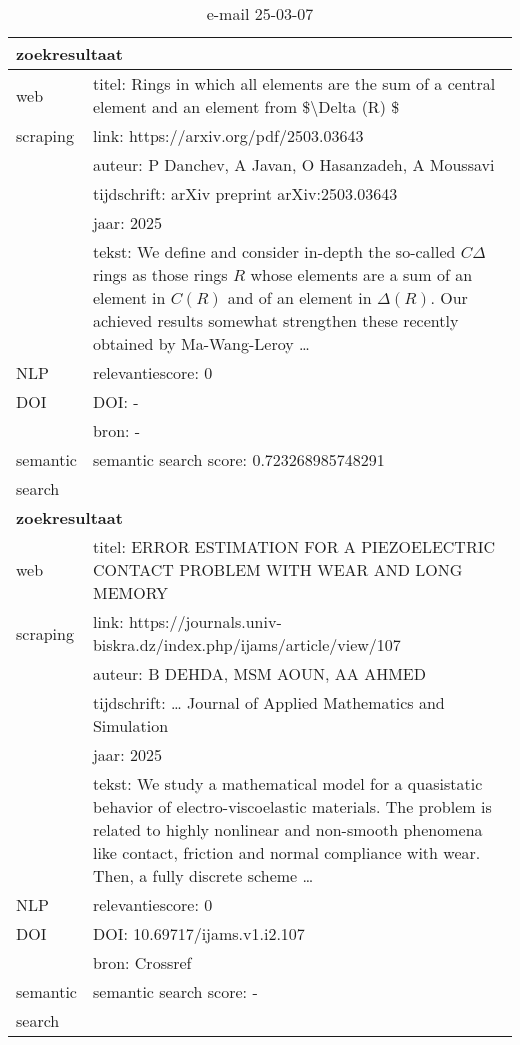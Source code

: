 \begin{table}[h!]
    \caption{e-mail 25-03-07}
    \centering
    \begin{tabularx}{\textwidth}{|p{4cm}|X|} 
        \hline
        \multicolumn{2}{|X|}{\textbf{zoekresultaat}} \\
        \hline
        web &titel: Rings in which all elements are the sum of a central element and an element from \$\textbackslash Delta (R) \$\\
        scraping&link: https://arxiv.org/pdf/2503.03643\\
        &auteur: P Danchev, A Javan, O Hasanzadeh, A Moussavi\\
        &tijdschrift: arXiv preprint arXiv:2503.03643\\
        &jaar: 2025\\
        &tekst: We define and consider in-depth the so-called $C\Delta$ rings as those rings $R$ whose elements are a sum of an element in $C(R)$ and of an element in $\Delta(R)$. Our achieved results somewhat strengthen these recently obtained by Ma-Wang-Leroy …\\
        \hline
        NLP&relevantiescore: 0\\
        \hline
        DOI&DOI: -\\
        &bron: -\\
        \hline
        semantic&semantic search score: 0.723268985748291\\
        search&\\
        \hline
        \multicolumn{2}{|X|}{\textbf{zoekresultaat}} \\
        \hline
        web &titel: ERROR ESTIMATION FOR A PIEZOELECTRIC CONTACT PROBLEM WITH WEAR AND LONG MEMORY\\
        scraping&link: https://journals.univ-biskra.dz/index.php/ijams/article/view/107\\
        &auteur: B DEHDA, MSM AOUN, AA AHMED\\
        &tijdschrift: … Journal of Applied Mathematics and Simulation\\
        &jaar: 2025\\
        &tekst: We study a mathematical model for a quasistatic behavior of electro-viscoelastic materials. The problem is related to highly nonlinear and non-smooth phenomena like contact, friction and normal compliance with wear. Then, a fully discrete scheme …\\
        \hline
        NLP&relevantiescore: 0\\
        \hline
        DOI&DOI: 10.69717/ijams.v1.i2.107\\
        &bron: Crossref\\
        \hline
        semantic&semantic search score: -\\
        search&\\
        \hline
    \end{tabularx}
    \label{table:email20250307}
\end{table}
